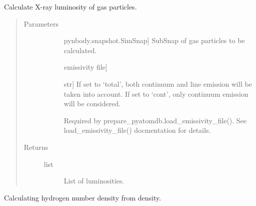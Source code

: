 \documentclass[letterpaper,10pt,english]{sphinxmanual}
\begin{document}
\begin{fulllineitems}
\label{\detokenize{gas_properties:modules.gas_properties.calcu_luminosity}}
Calculate X-ray luminosity of gas particles.
\begin{quote}\begin{description}
\item[{Parameters}] \leavevmode\begin{description}
\item[{}] \leavevmode{[}pynbody.snapshot.SimSnap{]}
SubSnap of gas particles to be calculated.

\item[{}] \leavevmode{[}emissivity file{]}
\item[{}] \leavevmode{[}str{]}
If set to ‘total’, both continuum and line emission 
will be taken into account. If set to ‘cont’, only 
continuum emission will be considered.

\item[{}] \leavevmode
Required by prepare\_pyatomdb.load\_emissivity\_file(). 
See load\_emissivity\_file() docmentation for details.

\end{description}

\item[{Returns}] \leavevmode\begin{description}
\item[{list}] \leavevmode
List of luminosities.

\end{description}

\end{description}\end{quote}

\end{fulllineitems}


\begin{fulllineitems}
\label{\detokenize{gas_properties:modules.gas_properties.nh}}
Calculating hydrogen number density from density.

\end{fulllineitems}
\end{document}
